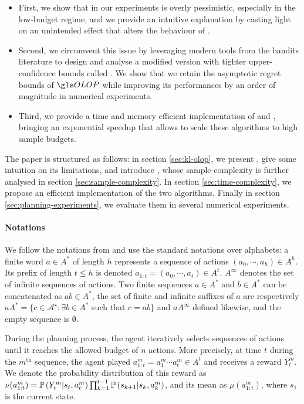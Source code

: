 \begin{itemize}
	\item First, we show that in our experiments \OLOP is overly pessimistic, especially in the low-budget regime, and we provide an intuitive explanation by casting light on an unintended effect that alters the behaviour of \OLOP.
	\item Second, we circumvent this issue by leveraging modern tools from the bandits literature to design and analyse a modified version with tighter upper-confidence bounds called \KLOLOP. We show that we retain the asymptotic regret bounds of $\OLOP$ while improving its performances by an order of magnitude in numerical experiments.
	\item Third, we provide a time and memory efficient implementation of \OLOP and \KLOLOP, bringing an exponential speedup that allows to scale these algorithms to high sample budgets.
\end{itemize}

The paper is structured as follows: in section \ref{sec:kl-olop}, we present \OLOP, give some intuition on its limitations, and introduce \KLOLOP, whose sample complexity is further analysed in section \ref{sec:sample-complexity}. In section \ref{sec:time-complexity}, we propose an efficient implementation of the two algorithms. Finally in section \ref{sec:planning-experiments}, we evaluate them in several numerical experiments.

\paragraph{Notations}
We follow the notations from \citep{Bubeck2010} and use the standard notations over alphabets: a finite word $a \in A^{\ast}$ of length $h$ represents a sequence of actions $(a_0, \cdots, a_h) \in A^h$. Its prefix of length $t \leq h$ is denoted $a_{1:t} = (a_0,\cdots,a_t) \in A^t$. $A^\infty$ denotes the set of infinite sequences of actions. Two finite sequences $a\in A^{\ast}$ and $b\in A^{\ast}$ can be concatenated as $ab\in A^{\ast}$, the set of finite and infinite suffixes of $a$ are respectively $a A^{\ast} = \{c\in\mathcal{A}^{\star}: \exists b\in A^{\ast}$ such that $c=ab\}$ and $aA^\infty$ defined likewise, and the empty sequence is $\emptyset$.

During the planning process, the agent iteratively selects sequences of actions until it reaches the allowed budget of $n$ actions. More precisely, at time $t$ during the $m^{\text{th}}$ sequence, the agent played $a^m_{1:t} = a^m_1 \cdots a^m_t \in A^t$ and receives a reward $Y_t^m$. We denote the probability distribution of this reward as $\nu(a_{1:t}^m) = \mathbb{P}\left(Y_t^m | s_t, a^m_t\right) \prod_{k=1}^{t-1} \mathbb{P}\left(s_{k+1} | s_{k}, a_{k}^m\right)$, and its mean as $\mu(a_{1:t}^m)$, where $s_1$ is the current state.

